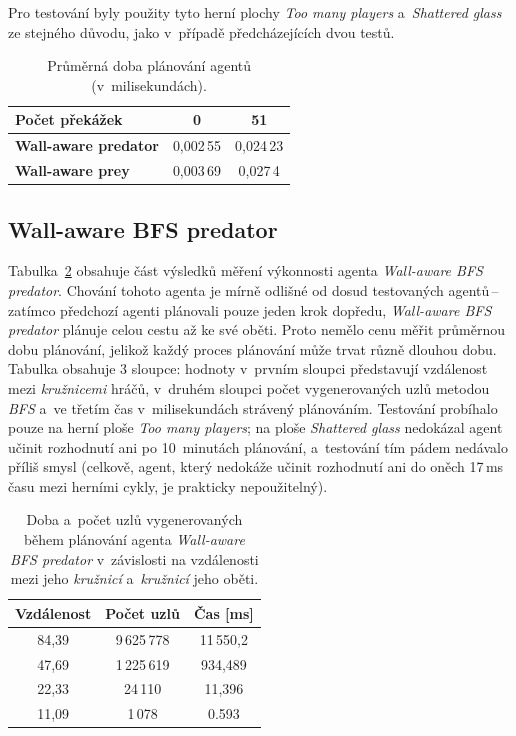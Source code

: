 Pro testování byly použity tyto herní plochy \emph{Too many players} a~\emph{Shattered glass} ze stejného důvodu, jako v~případě předcházejících dvou testů.

\begin{table}[ht]
    \centering
    \begin{tabular}{|l|c|c|} \hline
        \textbf{Počet překážek}      & \textbf{0}  & \textbf{51} \\ \hline\hline
        \textbf{Wall-aware predator} & 0,002\,55   & 0,024\,23   \\ \hline
        \textbf{Wall-aware prey}     & 0,003\,69   & 0,027\,4    \\ \hline
    \end{tabular}
    \caption{Průměrná doba plánování  agentů (v~milisekundách).}
    \label{tab:benchmark-wall-aware-bots}
\end{table}

\subsection*{Wall-aware BFS predator}

Tabulka~\ref{tab:benchmark-wall-aware-bfs-predator} obsahuje část výsledků měření výkonnosti agenta \emph{Wall-aware BFS predator}. Chování tohoto agenta je mírně odlišné od dosud testovaných agentů\,--\,zatímco předchozí agenti plánovali pouze jeden krok dopředu, \emph{Wall-aware BFS predator} plánuje celou cestu až ke své oběti. Proto nemělo cenu měřit průměrnou dobu plánování, jelikož každý proces plánování může trvat různě dlouhou dobu. Tabulka obsahuje 3 sloupce: hodnoty v~prvním sloupci představují vzdálenost mezi \emph{kružnicemi} hráčů, v~druhém sloupci počet vygenerovaných uzlů metodou \emph{BFS} a~ve třetím čas v~milisekundách strávený plánováním. Testování probíhalo pouze na herní ploše \emph{Too many players}; na ploše \emph{Shattered glass} nedokázal agent učinit rozhodnutí ani po 10~minutách plánování, a~testování tím pádem nedávalo příliš smysl (celkově, agent, který nedokáže učinit rozhodnutí ani do oněch 17\,ms času mezi herními cykly, je prakticky nepoužitelný).

\begin{table}[ht]
    \centering
    \begin{tabular}{|c|c|c|} \hline
        \textbf{Vzdálenost} & \textbf{Počet uzlů} & \textbf{Čas [ms]} \\ \hline
        84,39               & 9\,625\,778         & 11\,550,2    \\ \hline
        47,69               & 1\,225\,619         & 934,489      \\ \hline
        22,33               & 24\,110             & 11,396       \\ \hline
        11,09               & 1\,078              & 0.593        \\ \hline
    \end{tabular}
    \caption{Doba a~počet uzlů vygenerovaných během plánování agenta \emph{Wall-aware BFS predator} v~závislosti na vzdálenosti mezi jeho \emph{kružnicí} a~\emph{kružnicí} jeho oběti.}
    \label{tab:benchmark-wall-aware-bfs-predator}
\end{table}

